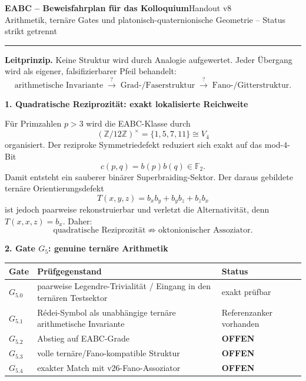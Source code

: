 \documentclass[10pt,a4paper]{article}
\newcommand{\OPEN}{\textcolor{amber}{\textbf{OFFEN}}}
\begin{document}
{\Large\bfseries EABC -- Beweisfahrplan für das Kolloquium}\hfill{\small Handout v8}\\[-1mm]
{\small Arithmetik, ternäre Gates und platonisch-quaternionische Geometrie -- Status strikt getrennt}
\vspace{2mm}
\hrule
\vspace{3mm}

\begin{proofbox}
\textbf{Leitprinzip.} Keine Struktur wird durch Analogie aufgewertet. Jeder Übergang wird als eigener, falsifizierbarer Pfeil behandelt:
\[
\text{arithmetische Invariante}
\;\stackrel{?}{\longrightarrow}\;
\text{Grad-/Faserstruktur}
\;\stackrel{?}{\longrightarrow}\;
\text{Fano-/Gitterstruktur}.
\]
\end{proofbox}

\textbf{1. Quadratische Reziprozität: exakt lokalisierte Reichweite}

Für Primzahlen $p>3$ wird die EABC-Klasse durch
\[
(\mathbb Z/12\mathbb Z)^\times=\{1,5,7,11\}\cong V_4
\]
organisiert. Der reziproke Symmetriedefekt reduziert sich exakt auf das mod-$4$-Bit
\[
c(p,q)=b(p)b(q)\in\mathbb F_2.
\]
Damit entsteht ein sauberer binärer Superbraiding-Sektor. Der daraus gebildete ternäre Orientierungsdefekt
\[
T(x,y,z)=b_xb_y+b_yb_z+b_zb_x
\]
ist jedoch paarweise rekonstruierbar und verletzt die Alternativität, denn $T(x,x,z)=b_x$. Daher:
\[
\boxed{\text{quadratische Reziprozität}\not\Rightarrow\text{oktonionischer Assoziator}.}
\]

\textbf{2. Gate $G_5$: genuine ternäre Arithmetik}

\begin{center}
\small
\begin{tabularx}{\textwidth}{>{\bfseries}l X l}
\toprule
Gate & Prüfgegenstand & Status\\
\midrule
$G_{5.0}$ & paarweise Legendre-Trivialität / Eingang in den ternären Testsektor & exakt prüfbar\\
$G_{5.1}$ & Rédei-Symbol als unabhängige ternäre arithmetische Invariante & Referenzanker vorhanden\\
$G_{5.2}$ & Abstieg auf EABC-Grade & \OPEN\\
$G_{5.3}$ & volle ternäre/Fano-kompatible Struktur & \OPEN\\
$G_{5.4}$ & exakter Match mit v26-Fano-Assoziator & \OPEN\\
\bottomrule
\end{tabularx}
\end{center}
\end{document}
